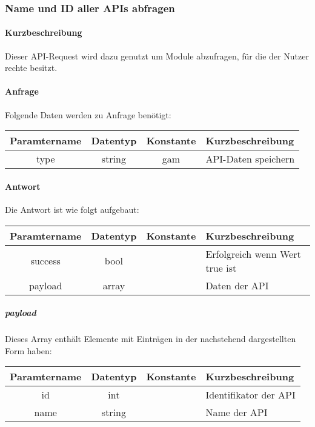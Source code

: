 \subsubsection{Name und ID aller APIs abfragen}
\paragraph{Kurzbeschreibung}Dieser API-Request wird dazu genutzt um Module abzufragen, für die der Nutzer rechte besitzt.
\paragraph{Anfrage}Folgende Daten werden zu Anfrage benötigt:
\begin{table}[H]
	\begin{tabular}{|c|c|c|p{6.5cm}|}
		\hline
		\textbf{Paramtername} & \textbf{Datentyp} & \textbf{Konstante} & \textbf{Kurzbeschreibung}                                                                                               \\ \hline
		type                & string            & gam                & API-Daten speichern \\ \hline
	\end{tabular}
\end{table}
\paragraph{Antwort}Die Antwort ist wie folgt aufgebaut:
\begin{table}[H]
	\begin{tabular}{|c|c|c|p{6.5cm}|}
		\hline
		\textbf{Paramtername} & \textbf{Datentyp} & \textbf{Konstante} & \textbf{Kurzbeschreibung}            \\ \hline                
		success             & bool             &                 & Erfolgreich wenn Wert {\glqq true\grqq} ist \\ \hline
		payload             & array            &                 & Daten der API \\ \hline
	\end{tabular}
\end{table}
\subparagraph{payload}Dieses Array enthält Elemente mit Einträgen in der nachstehend dargestellten Form haben:
\begin{table}[H]
	\begin{tabular}{|c|c|c|p{6.5cm}|}
		\hline
		\textbf{Paramtername} & \textbf{Datentyp} & \textbf{Konstante} & \textbf{Kurzbeschreibung}    \\ \hline
		id                      & int               &                 & Identifikator der API \\ \hline
		name                    & string            &                 & Name der API \\ \hline
	\end{tabular}
\end{table}
